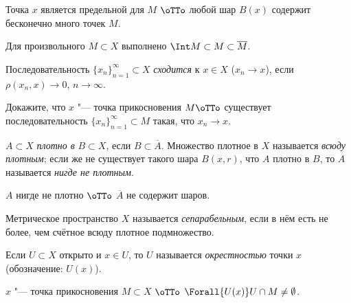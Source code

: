 \documentclass[main]{subfiles}
\begin{document}
\begin{proposition}
  Точка \( x \) является предельной для \( M \) \( \oTTo \) любой шар
  \( B(x) \) содержит бесконечно много точек \( M \).
\end{proposition}

\begin{remark}
  Для произвольного \( M \subset X \) выполнено
  \( \Int M \subset M \subset \overline{M} \).
\end{remark}

\begin{definition}
  Последовательность \( \{ x_n \}_{n=1}^\infty \subset X \)
  \emph{сходится} к \( x \in X \) (\( x_n \to x \)),
  если \( \rho(x_n, x) \to 0 \), \( n \to \infty \).
\end{definition}

\begin{exercise}
  Докажите, что \( x \) "--- точка прикосновения \( M \oTTo \)
  существует последовательность \( \{ x_n \}_{n=1}^\infty \subset M \)
  такая, что \( x_n \to x \).
\end{exercise}

\begin{definition}
  \( A \subset X \) \emph{плотно в} \( B \subset X \),
  если \( B \subset \overline{A} \).
  Множество плотное в \( X \) называется \emph{всюду плотным};
  если же не существует такого шара \( B(x, r) \),
  что \( A \) плотно в \( B \),
  то \( A \) называется \emph{нигде не плотным}.
\end{definition}

\begin{proposition}
  \( A \) нигде не плотно \( \oTTo \) \( \overline{A} \) не содержит шаров.
\end{proposition}

\begin{definition}
  Метрическое пространство \( X \) называется \emph{сепарабельным},
  если в нём есть не более, чем счётное всюду плотное подмножество.
\end{definition}

\begin{definition}
  Если \( U \subset X \) открыто и \( x \in U \), то
  \( U \) называется \emph{окрестностью} точки \( x \)
  (обозначение: \( U(x) \)).
\end{definition}

\begin{proposition}
  \( x \) "--- точка прикосновения \( M \subset X \)
  \( \oTTo \) \( \Forall{U(x)} U \cap M \ne \emptyset \).
\end{proposition}
\end{document}
